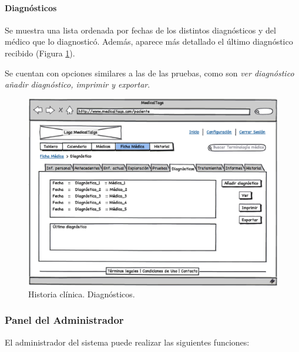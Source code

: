 		
		\paragraph{Diagnósticos} %
		\label{par:interface_diagnosticos}
		
			Se muestra una lista ordenada por fechas de los distintos diagnósticos y del médico que lo diagnosticó. Además, aparece más detallado el último diagnóstico recibido (Figura \ref{fig:diagnostico}). 
			
			Se cuentan con opciones similares a las de las pruebas, como son \textit{ver diagnóstico} \textit{añadir diagnóstico, imprimir y exportar}.
			
			
			\begin{figure}[H]
			  \centering
			    \includegraphics[width=12cm]{img/eps/36_Diagnosticos_Pacientes.eps}
			  \caption{Historia clínica. Diagnósticos.}
			  \label{fig:diagnostico}
			\end{figure}
		
		
	\subsubsection{Panel del Administrador} %
		\label{sub:panel_administrador}
	
		El administrador del sistema puede realizar las siguientes funciones:
		
